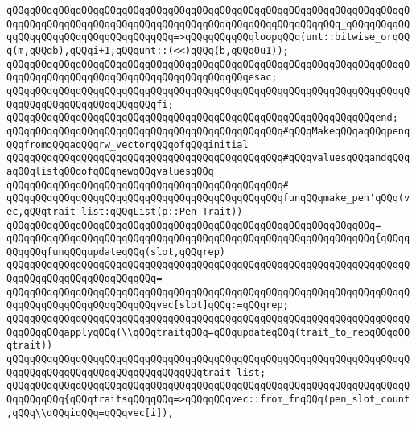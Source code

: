 \verb|qQQqqQQqqQQqqQQqqQQqqQQqqQQqqQQqqQQqqQQqqQQqqQQqqQQqqQQqqQQqqQQqqQQqqQQqqQQqqQQqqQQqqQQqqQQqqQQqqQQqqQQqqQQqqQQqqQQqqQQqqQQqqQQq_qQQqqQQqqQQqqQQqqQQqqQQqqQQqqQQqqQQqqQQq=>qQQqqQQqqQQqloopqQQq(unt::bitwise_orqQQq(m,qQQqb),qQQqi+1,qQQqunt::(<<)qQQq(b,qQQq0u1));|\newline
\verb|qQQqqQQqqQQqqQQqqQQqqQQqqQQqqQQqqQQqqQQqqQQqqQQqqQQqqQQqqQQqqQQqqQQqqQQqqQQqqQQqqQQqqQQqqQQqqQQqqQQqqQQqqQQqqQQqesac;|\newline
\verb|qQQqqQQqqQQqqQQqqQQqqQQqqQQqqQQqqQQqqQQqqQQqqQQqqQQqqQQqqQQqqQQqqQQqqQQqqQQqqQQqqQQqqQQqqQQqqQQqfi;|\newline
\verb|qQQqqQQqqQQqqQQqqQQqqQQqqQQqqQQqqQQqqQQqqQQqqQQqqQQqqQQqqQQqqQQqend;|\newline
\newline
\verb|qQQqqQQqqQQqqQQqqQQqqQQqqQQqqQQqqQQqqQQqqQQqqQQq#qQQqMakeqQQqaqQQqpenqQQqfromqQQqaqQQqrw_vectorqQQqofqQQqinitial|\newline
\verb|qQQqqQQqqQQqqQQqqQQqqQQqqQQqqQQqqQQqqQQqqQQqqQQq#qQQqvaluesqQQqandqQQqaqQQqlistqQQqofqQQqnewqQQqvaluesqQQq|\newline
\verb|qQQqqQQqqQQqqQQqqQQqqQQqqQQqqQQqqQQqqQQqqQQqqQQq#|\newline
\verb|qQQqqQQqqQQqqQQqqQQqqQQqqQQqqQQqqQQqqQQqqQQqqQQqfunqQQqmake_pen'qQQq(vec,qQQqtrait_list:qQQqList(p::Pen_Trait))|\newline
\verb|qQQqqQQqqQQqqQQqqQQqqQQqqQQqqQQqqQQqqQQqqQQqqQQqqQQqqQQqqQQqqQQq=|\newline
\verb|qQQqqQQqqQQqqQQqqQQqqQQqqQQqqQQqqQQqqQQqqQQqqQQqqQQqqQQqqQQqqQQq{qQQqqQQqqQQqfunqQQqupdateqQQq(slot,qQQqrep)|\newline
\verb|qQQqqQQqqQQqqQQqqQQqqQQqqQQqqQQqqQQqqQQqqQQqqQQqqQQqqQQqqQQqqQQqqQQqqQQqqQQqqQQqqQQqqQQqqQQqqQQq=|\newline
\verb|qQQqqQQqqQQqqQQqqQQqqQQqqQQqqQQqqQQqqQQqqQQqqQQqqQQqqQQqqQQqqQQqqQQqqQQqqQQqqQQqqQQqqQQqqQQqqQQqvec[slot]qQQq:=qQQqrep;|\newline
\newline
\verb|qQQqqQQqqQQqqQQqqQQqqQQqqQQqqQQqqQQqqQQqqQQqqQQqqQQqqQQqqQQqqQQqqQQqqQQqqQQqqQQqapplyqQQq(\\qQQqtraitqQQq=qQQqupdateqQQq(trait_to_repqQQqqQQqtrait))|\newline
\verb|qQQqqQQqqQQqqQQqqQQqqQQqqQQqqQQqqQQqqQQqqQQqqQQqqQQqqQQqqQQqqQQqqQQqqQQqqQQqqQQqqQQqqQQqqQQqqQQqqQQqqQQqtrait_list;|\newline
\newline
\verb|qQQqqQQqqQQqqQQqqQQqqQQqqQQqqQQqqQQqqQQqqQQqqQQqqQQqqQQqqQQqqQQqqQQqqQQqqQQqqQQq{qQQqtraitsqQQqqQQq=>qQQqqQQqvec::from_fnqQQq(pen_slot_count,qQQq\\qQQqiqQQq=qQQqvec[i]),|\newline
